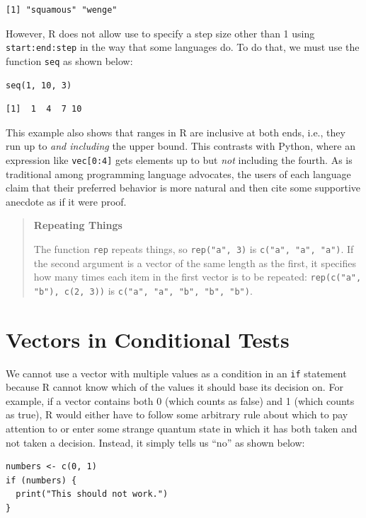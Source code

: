 \begin{lstlisting}
[1] "squamous" "wenge"   
\end{lstlisting}

However, R does not allow use to specify a step size other than 1 using \texttt{start:end:step}
in the way that some languages do.
To do that,
we must use the function \texttt{seq} as shown below:

\begin{lstlisting}
seq(1, 10, 3)
\end{lstlisting}

\begin{lstlisting}
[1]  1  4  7 10
\end{lstlisting}

This example also shows that ranges in R are inclusive at both ends,
i.e.,
they run up to \emph{and including} the upper bound.
This contrasts with Python,
where an expression like \texttt{vec[0:4]} gets elements up to but \emph{not} including the fourth.
As is traditional among programming language advocates,
the users of each language claim that their preferred behavior is more natural
and then cite some supportive anecdote as if it were proof.

\begin{quote}
\textbf{Repeating Things}

The function \texttt{rep} repeats things,
so \texttt{rep("a", 3)} is \texttt{c("a", "a", "a")}.
If the second argument is a vector of the same length as the first,
it specifies how many times each item in the first vector is to be repeated:
\texttt{rep(c("a", "b"), c(2, 3))} is \texttt{c("a", "a", "b", "b", "b")}.
\end{quote}

\section{Vectors in Conditional Tests}

We cannot use a vector with multiple values as a condition in an \texttt{if} statement
because R cannot know which of the values it should base its decision on.
For example,
if a vector contains both 0 (which counts as false) and 1 (which counts as true),
R would either have to follow some arbitrary rule about which to pay attention to
or enter some strange quantum state in which it has both taken and not taken a decision.
Instead,
it simply tells us ``no'' as shown below:

\begin{lstlisting}
numbers <- c(0, 1)
if (numbers) {
  print("This should not work.")
}
\end{lstlisting}

